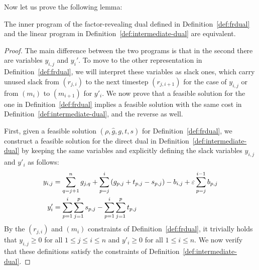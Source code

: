 Now let us prove the following lemma:
\begin{lemma}\label{lem:fr-intermediate-eq-dual}
    The inner program of the factor-revealing dual defined in Definition~\ref{def:frdual} and the linear program in Definition~\ref{def:intermediate-dual} are equivalent.
\end{lemma}
\begin{proof}
    The main difference between the two programs is that in the second there are variables $y_{i,j}$ and $y_i'$. To move to the other representation in Definition~\ref{def:frdual}, we will interpret these variables as slack ones, which carry unused slack from $(r_{j,i})$ to the next timestep $(r_{j,i+1})$ for the case of $y_{i,j}$ or from $(m_i)$ to $(m_{i+1})$ for $y'_i$. We now prove that a feasible solution for the one in Definition~\ref{def:frdual} implies a feasible solution with the same cost in Definition~\ref{def:intermediate-dual}, and the reverse as well.
    
    First, given a feasible solution $(\rho, \hat{g}, g, t, s)$ for Definition~\ref{def:frdual}, we construct a feasible solution for the direct dual in Definition~\ref{def:intermediate-dual} by keeping the same variables and explicitly defining the slack variables $y_{i,j}$ and $y'_i$ as follows:
    \begin{align*}
        y_{i,j} &= \sum_{q=j+1}^n g_{j,q} + \sum_{p=j}^{i} \left(g_{p,j} + t_{p,j} - s_{p,j}\right) - b_{i,j} + \varepsilon \sum_{p=j}^{i-1} b_{p,j} \\
        y'_i &= \sum_{p=1}^i \sum_{j=1}^p s_{p,j} - \sum_{p=1}^i \sum_{j=1}^p t_{p,j}
    \end{align*}
    By the $(r_{j,i})$ and $(m_i)$ constraints of Definition~\ref{def:frdual}, it trivially holds that $y_{i,j} \geq 0$ for all $1 \le j \le i \le n$ and $y'_i \geq 0$ for all $1 \le i \le n$. We now verify that these definitions satisfy the constraints of Definition~\ref{def:intermediate-dual}.
    

\end{proof}
